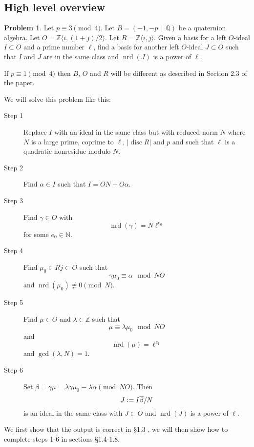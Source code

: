 \documentclass[10pt]{article}
\theoremstyle{plain}
\theoremstyle{definition}
\newtheorem{prob}[theorem]{Problem}
\newcommand{\op}{\operatorname}
\newcommand{\N}{\mathbb{N}}
\newcommand{\Z}{\mathbb{Z}}
\newcommand{\Q}{\mathbb{Q}}
\newcommand{\nrd}{\op{nrd}}
\newcommand{\disc}{\op{disc}}
\begin{document}
\subsection{High level overview}

\begin{prob}
    Let \( p \equiv 3 \pmod{4} \).
    Let \( B =  (-1, -p \, \mid \, \Q) \) be a quaternion algebra.
    Let \( O = \Z \langle i, (1+j) / 2 \rangle \).
    Let \( R = \Z \langle i , j \rangle \).
    Given a basis for a left \( O \)-ideal \( I \subset O \) and a prime number \( \ell \), find a basis for another left \( O \)-ideal \( J \subset O \) such that \( I \) and \( J \) are in the same class and \( \nrd(J) \) is a power of \( \ell \).
\end{prob}

If \( p \equiv 1 \pmod{4} \) then \( B \), \( O \) and \( R \) will be different as described in Section 2.3 of the paper.

We will solve this problem like this:
\begin{description}
    \item[Step 1]
    Replace \( I \) with an ideal in the same class but with reduced norm \( N \) where \( N \) is a large prime, coprime to \( \ell \), \( |\disc R| \) and \( p \) and such that \( \ell \) is a quadratic nonresidue modulo \( N \).
    \item[Step 2]
    Find \( \alpha \in I \) such that \( I = ON + O\alpha \).
    \item[Step 3]
    Find \( \gamma \in O \) with \[ \nrd(\gamma) = N \ell^{e_0} \] for some \( e_0 \in \N \).
    \item[Step 4]
    Find \( \mu_0 \in Rj \subset  O \) such that \[ \gamma\mu_0 \equiv \alpha \mod NO \] and \( \nrd(\mu_0) \not\equiv 0 \pmod{N} \).
    \item[Step 5]
    Find \( \mu \in  O \) and \( \lambda \in \Z \) such that \[ \mu \equiv \lambda \mu_0 \mod NO \] and \[ \nrd(\mu) = \ell^{e_1} \] and \( \gcd(\lambda, N) = 1 \).
    \item[Step 6]
    Set \( \beta = \gamma \mu = \lambda\gamma\mu_0 \equiv \lambda \alpha \pmod{NO} \).
    Then \[ J \vcentcolon = I\overline{\beta}/N \] is an ideal in the same class with \( J \subset O \) and \( \nrd(J) \) is a power of \( \ell \).
\end{description}

We first show that the output is correct in \S 1.3 , we will then show how to complete steps 1-6 in sections \S 1.4-1.8.
\end{document}
